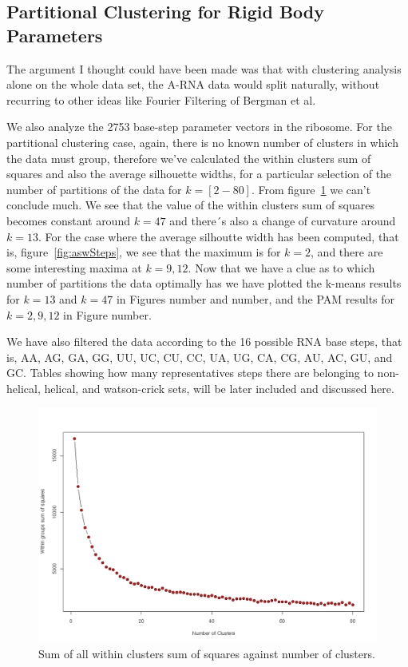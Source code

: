 %
%


\subsection{Partitional Clustering for Rigid Body Parameters}
The argument I thought could have been made was that with clustering
analysis alone on the whole data set, the A-RNA data would split
naturally, without recurring to other ideas like Fourier Filtering of
Bergman et al.

We also analyze the 2753 base-step parameter vectors in the ribosome.
For the partitional clustering case,
again, there  is no known  number of clusters  in which the  data must
group, therefore  we've calculated the within clusters  sum of squares
and also the average silhouette  widths, for a particular selection of
the  number   of  partitions  of   the  data  for   $k=[2-80]$.   From
figure~\ref{fig:wssSteps}  we can't  conclude  much. We  see that  the
value of  the within clusters  sum of squares becomes  constant around
$k=47$ and there´s also a  change of curvature around $k=13$.  For the
case where  the average  silhoutte width has  been computed,  that is,
figure~\ref{fig:aswSteps}, we  see that the maximum is  for $k=2$, and
there are  some interesting  maxima at $k=9,12$.   Now that we  have a
clue as to  which number of partitions the data  optimally has we have
plotted the  k-means results for  $k=13$ and $k=47$ in  Figures number
and number, and the PAM results for $k=2, 9, 12$ in Figure number.

We have also  filtered the data according to the  16 possible RNA base
steps, that is,  AA, AG, GA, GG, UU,  UC, CU, CC, UA, UG,  CA, CG, AU,
AC, GU, and  GC.  Tables showing how many  representatives steps there
are belonging to non-helical,  helical, and watson-crick sets, will be
later included and discussed here.
\begin{figure}[htbp]
\centering
\includegraphics[angle=0, scale=0.40]{Chapter2/hartigan_nuclu_steps_b.png}
\caption{Sum of all within clusters sum of squares against number of clusters.}
\label{fig:wssSteps}
\end{figure}

